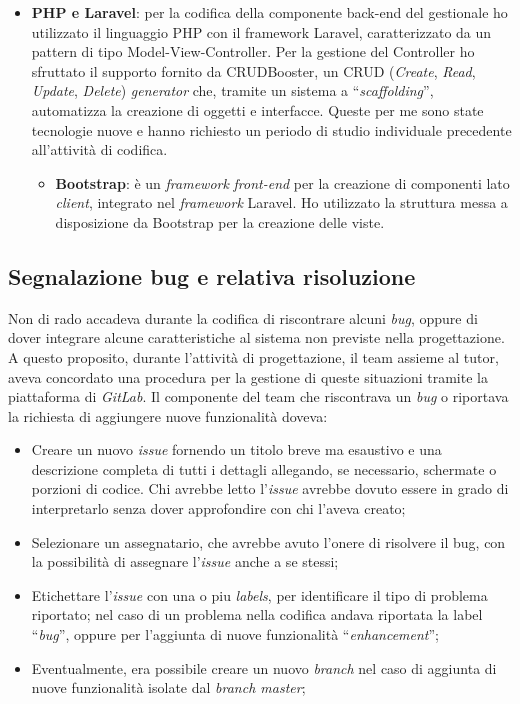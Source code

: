 \begin{itemize}
\item \textbf{PHP e Laravel}: per la codifica della componente back-end del gestionale ho utilizzato il linguaggio PHP con il framework Laravel, caratterizzato da un pattern di tipo Model-View-Controller. Per la gestione del Controller ho sfruttato il supporto fornito da CRUDBooster, un CRUD (\textit{Create}, \textit{Read}, \textit{Update}, \textit{Delete}) \textit{generator} che, tramite un sistema a ``\textit{scaffolding}'', automatizza la creazione di oggetti e interfacce. Queste per me sono state tecnologie nuove e hanno richiesto un periodo di studio individuale precedente all'attività di codifica.
	\begin{itemize}
		\item \textbf{Bootstrap}: è un \textit{framework} \textit{front-end} per la creazione di componenti lato \textit{client}, integrato nel \textit{framework} Laravel. Ho utilizzato la struttura messa a disposizione da Bootstrap per la creazione delle viste.
	\end{itemize}
\end{itemize}

\subsection{Segnalazione bug e relativa risoluzione}
Non di rado accadeva durante la codifica di riscontrare alcuni \textit{bug}, oppure di dover integrare alcune caratteristiche al sistema non previste nella progettazione. A questo proposito, durante l'attività di progettazione, il team assieme al tutor, aveva concordato una procedura per la gestione di queste situazioni tramite la piattaforma di \textit{GitLab}. Il componente del team che riscontrava un \textit{bug} o riportava la richiesta di aggiungere nuove funzionalità doveva:
\begin{itemize}
\item Creare un nuovo \textit{issue} fornendo un titolo breve ma esaustivo e una descrizione completa di tutti i dettagli allegando, se necessario, schermate o porzioni di codice. Chi avrebbe letto l'\textit{issue} avrebbe dovuto essere in grado di interpretarlo senza dover approfondire con chi l'aveva creato;
\item Selezionare un assegnatario, che avrebbe avuto l'onere di risolvere il bug, con la possibilità di assegnare l'\textit{issue} anche a se stessi;
\item Etichettare l'\textit{issue} con una o piu \textit{labels}, per identificare il tipo di problema riportato; nel caso di un problema nella codifica andava riportata la label ``\textit{bug}'', oppure per l'aggiunta di nuove funzionalità ``\textit{enhancement}'';
\item Eventualmente, era possibile creare un nuovo \textit{branch} nel caso di aggiunta di nuove funzionalità isolate dal \textit{branch master};
\end{itemize}

